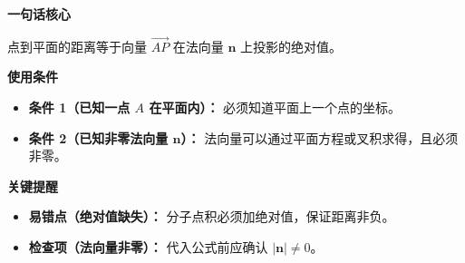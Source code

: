 \begin{summarybox}
	\textbf{\textcolor{CSummary}{一句话核心}}

	点到平面的距离等于向量 $\vec{AP}$ 在法向量 $\mathbf{n}$ 上投影的绝对值。

	\medskip
	\textbf{\textcolor{CSummary}{使用条件}}
	\begin{itemize}[leftmargin=*, itemsep=0.5em, topsep=0.4em]
		\item \textbf{条件 1（已知一点 $A$ 在平面内）：} 必须知道平面上一个点的坐标。
		\item \textbf{条件 2（已知非零法向量 $\mathbf{n}$）：} 法向量可以通过平面方程或叉积求得，且必须非零。
	\end{itemize}

	\medskip
	\textbf{\textcolor{CSummary}{关键提醒}}
	\begin{itemize}[leftmargin=*, itemsep=0.5em, topsep=0.4em]
		\item \textbf{易错点（绝对值缺失）：} 分子点积必须加绝对值，保证距离非负。
		\item \textbf{检查项（法向量非零）：} 代入公式前应确认 $|\mathbf{n}|\neq0$。
	\end{itemize}
\end{summarybox}
